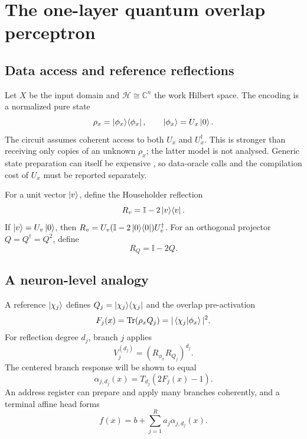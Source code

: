 \documentclass[pdflatex,sn-mathphys,NameDate,iicol]{sn-jnl}
\newcommand{\Tr}{\operatorname{Tr}}
\newcommand{\id}{\mathbb{I}}
\newcommand{\C}{\mathbb{C}}
\newcommand{\proj}[1]{\ket{#1}\!\bra{#1}}
\newcommand{\cH}{\mathcal{H}}
\begin{document}
\section{The one-layer quantum overlap perceptron}
\label{sec:perceptron}

\subsection{Data access and reference reflections}

Let $X$ be the input domain and $\cH\cong\C^n$ the work Hilbert space. The
encoding is a normalized pure state
\begin{equation}
  \rho_x=\proj{\phi_x},
  \qquad
  \ket{\phi_x}=U_x\ket{0}.
  \label{eq:data-state}
\end{equation}
The circuit assumes coherent access to both $U_x$ and $U_x^\dagger$. This
is stronger than receiving only copies of an unknown $\rho_x$; the latter
model is not analysed. Generic state preparation can itself be expensive
\citep{iten2016isometries}, so data-oracle calls and the compilation cost of
$U_x$ must be reported separately.

For a unit vector $\ket v$, define the Householder reflection
\begin{equation}
  R_v=\id-2\proj v.
  \label{eq:state-reflection}
\end{equation}
If $\ket v=U_v\ket0$, then
$R_v=U_v(\id-2\proj0)U_v^\dagger$. For an orthogonal projector
$Q=Q^\dagger=Q^2$, define
\begin{equation}
  R_Q=\id-2Q.
  \label{eq:projector-reflection}
\end{equation}

\subsection{A neuron-level analogy}

A reference $\ket{\chi_j}$ defines
$Q_j=\proj{\chi_j}$ and the overlap pre-activation
\begin{equation}
  F_j(x)=\Tr(\rho_xQ_j)=|\braket{\chi_j | \phi_x}|^2.
  \label{eq:fidelity-preactivation}
\end{equation}
For reflection degree $d_j$, branch $j$ applies
\begin{equation}
  V_j^{(d_j)}=(R_{\phi_x}R_{Q_j})^{d_j}.
  \label{eq:first-branch}
\end{equation}
The centered branch response will be shown to equal
\begin{equation}
  \alpha_{j,d_j}(x)
  =
  T_{d_j}\!\left(2F_j(x)-1\right).
  \label{eq:first-activation-preview}
\end{equation}
An address register can prepare and apply many branches coherently, and a
terminal affine head forms
\begin{equation}
  f(x)=b+\sum_{j=1}^{R}a_j\alpha_{j,d_j}(x).
  \label{eq:affine-hidden-head}
\end{equation}
\end{document}
